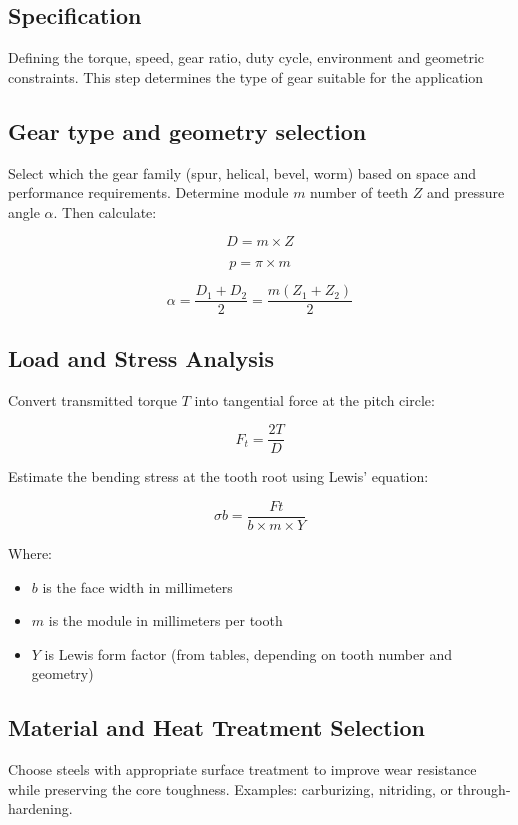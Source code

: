 \documentclass[11pt]{article}
\begin{document}
\subsection*{Specification}

Defining the torque, speed, gear ratio, duty cycle, environment and geometric constraints.
This step determines the type of gear suitable for the application

\subsection*{Gear type and geometry selection}

Select which the gear family (spur, helical, bevel, worm) based on space and performance requirements. Determine module $m$ number of teeth $Z$ and pressure angle $\alpha$.
Then calculate:

$$
	D = m \times Z
$$

$$
	p = \pi \times m
$$

$$
	\alpha = \frac{D_1 + D_2}{2} = \frac{m(Z_1 + Z_2)}{2}
$$

\subsection*{Load and Stress Analysis}

Convert transmitted torque $T$ into tangential force at the pitch circle:

$$
	F_t = \frac{2T}{D}
$$

Estimate the bending stress at the tooth root using Lewis' equation:

$$
	\sigma b = \frac{Ft}{b \times m \times Y}
$$

Where:
\begin{itemize}
	\item $b$ is the face width in millimeters
	\item $m$ is the module in millimeters per tooth
	\item $Y$ is Lewis form factor (from tables, depending on tooth number and geometry)
\end{itemize}

\subsection*{Material and Heat Treatment Selection}

Choose steels with appropriate surface treatment to improve wear resistance while preserving the core toughness.
Examples: carburizing, nitriding, or through-hardening.
\end{document}
